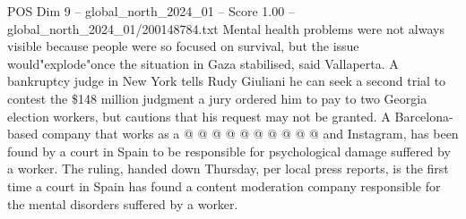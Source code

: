 \begin{textsample}{POS Dim 9 – global\_north\_2024\_01 – Score 1.00 – global\_north\_2024\_01/200148784.txt}
Mental health problems were not always visible because people were so focused on survival, but the issue would"explode"once the situation in Gaza stabilised, said Vallaperta.
A bankruptcy judge in New York tells Rudy Giuliani he can seek a second trial to contest the \$148 million judgment a jury ordered him to pay to two Georgia election workers, but cautions that his request may not be granted.
A Barcelona-based company that works as a @ @ @ @ @ @ @ @ @ @ and Instagram, has been found by a court in Spain to be responsible for psychological damage suffered by a worker.
The ruling, handed down Thursday, per local press reports, is the first time a court in Spain has found a content moderation company responsible for the mental disorders suffered by a worker.

\end{textsample}
